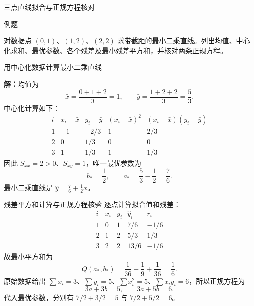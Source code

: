 \documentclass[aspectratio=169,10pt,fontset=fandol]{ctexbeamer}
\begin{document}
\begin{frame}[t,fragile]{三点直线拟合与正规方程核对}
\normalsize
\begin{block}{例题}
{\normalsize
对数据点 $(0,1)$、$(1,2)$、$(2,2)$ 求带截距的最小二乘直线。列出均值、中心化求和、最优参数、各个残差及最小残差平方和，并核对两条正规方程。

}
\end{block}
\end{frame}
\begin{frame}[t,fragile]{用中心化数据计算最小二乘直线}
\footnotesize
{\footnotesize
\par\noindent\textbf{解：}均值为
\[
\bar{x}=\frac{0+1+2}{3}=1,\qquad
\bar{y}=\frac{1+2+2}{3}=\frac53.
\]
中心化计算如下：
\[
\begin{array}{c|r|r|r|r}
i&x_i-\bar{x}&y_i-\bar{y}&(x_i-\bar{x})^2&(x_i-\bar{x})(y_i-\bar{y})\\ \hline
1&-1&-2/3&1&2/3\\
2&0&1/3&0&0\\
3&1&1/3&1&1/3
\end{array}
\]
因此 $S_{xx}=2>0$、$S_{xy}=1$，唯一最优参数为
\[
b_* =\frac12,\qquad a_* =\frac53-\frac12=\frac76.
\]
最小二乘直线是 $\hat{y}=\frac76+\frac12x$。
}
\end{frame}
\begin{frame}[t,fragile]{残差平方和计算与正规方程核验}
\footnotesize
{\footnotesize
逐点计算拟合值和残差：
\[
\begin{array}{c|r|r|r|r}
i&x_i&y_i&\hat{y}_i&r_i\\ \hline
1&0&1&7/6&-1/6\\
2&1&2&5/3&1/3\\
3&2&2&13/6&-1/6
\end{array}
\]
故最小平方和为
\[
Q(a_*,b_*)=\frac1{36}+\frac19+\frac1{36}=\frac16.
\]
原始数据给出 $\sum x_i=3$、$\sum y_i=5$、$\sum x_i^2=5$、$\sum x_i y_i=6$，所以正规方程为
\[
3a+3b=5,\qquad 3a+5b=6.
\]
代入最优参数，分别有 $7/2+3/2=5$ 与 $7/2+5/2=6$。
}
\end{frame}
\end{document}
